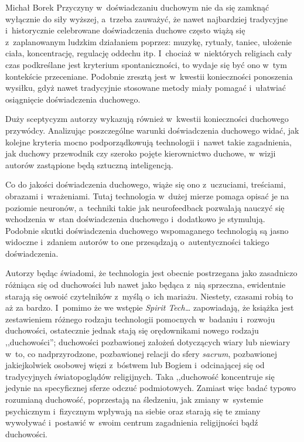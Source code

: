 \begin{newrevplenv}{Michał Borek}
Przyczyny w~doświadczaniu duchowym nie da się zamknąć wyłącznie do siły wyższej, a~trzeba zauważyć, że nawet najbardziej tradycyjne i~historycznie celebrowane doświadczenia duchowe często wiążą się z~zaplanowanym ludzkim działaniem poprzez: muzykę, rytuały, taniec, ułożenie ciała, koncentrację, regulację oddechu itp. I~chociaż w~niektórych religiach cały czas podkreślane jest kryterium spontaniczności, to wydaje się być ono w~tym kontekście przeceniane. Podobnie zresztą jest w~kwestii konieczności ponoszenia wysiłku, gdyż nawet tradycyjnie stosowane metody miały pomagać i~ułatwiać osiągnięcie doświadczenia duchowego.

Duży sceptycyzm autorzy wykazują również w~kwestii konieczności duchowego przywódcy. Analizując poszczególne warunki doświadczenia duchowego widać, jak kolejne kryteria mocno podporządkowują technologii i~nawet takie zagadnienia, jak duchowy przewodnik czy szeroko pojęte kierownictwo duchowe, w~wizji autorów zastąpione będą sztuczną inteligencją.

Co do jakości doświadczenia duchowego, wiąże się ono z~uczuciami, treściami, obrazami i~wrażeniami. Tutaj technologia w~dużej mierze pomaga opisać je na poziomie neuronów, a~techniki takie jak neurofeedback pozwalają nauczyć się wchodzenia w~stan doświadczenia duchowego i~dodatkowo je stymulują. Podobnie skutki doświadczenia duchowego wspomaganego technologią są jasno widoczne i~zdaniem autorów to one przesądzają o~autentyczności takiego doświadczenia.

Autorzy będąc świadomi, że technologia jest obecnie postrzegana jako zasadniczo różniąca się od duchowości lub nawet jako będąca z~nią sprzeczna, ewidentnie starają się oswoić czytelników z~myślą o~ich mariażu. Niestety, czasami robią to aż za bardzo. I~pomimo że we wstępie \textit{Spirit Tech\ldots} zapowiadają, że książka jest zestawieniem różnego rodzaju technologii pomocnych w~badaniu i~rozwoju duchowości, ostatecznie jednak stają się orędownikami nowego rodzaju ,,duchowości''; duchowości pozbawionej założeń dotyczących wiary lub niewiary w~to, co nadprzyrodzone, pozbawionej relacji do sfery \textit{sacrum}, pozbawionej jakiejkolwiek osobowej więzi z~bóstwem lub Bogiem i~odcinającej się od tradycyjnych światopoglądów religijnych. Taka ,,duchowość koncentruje się jedynie na specyficznej sferze odczuć podmiotowych. Zamiast więc badać typowo rozumianą duchowość, poprzestają na śledzeniu, jak zmiany w~systemie psychicznym i~fizycznym wpływają na siebie oraz starają się te zmiany wywoływać i~postawić w~swoim centrum zagadnienia religijności bądź duchowości.


\end{newrevplenv}
